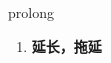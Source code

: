 
\begin{frame}
{\huge prolong}
\begin{center}
\begin{enumerate}\Large
  \item \textbf{延长，拖延}
\end{enumerate}
\end{center}
\end{frame}

